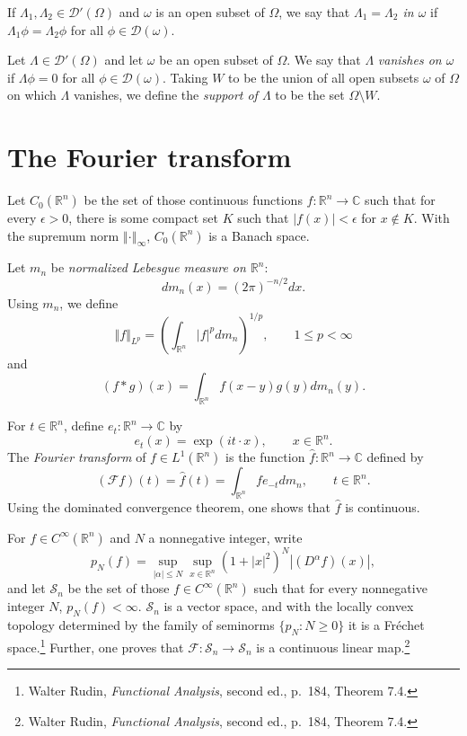 \documentclass{article}
\newcommand{\norm}[1]{\left\Vert #1 \right\Vert}
\theoremstyle{definition}
\begin{document}
If $\Lambda_1,\Lambda_2 \in \mathscr{D}'(\Omega)$ and $\omega$ is an open subset of $\Omega$, we say that
{\em $\Lambda_1 = \Lambda_2$ in $\omega$} if $\Lambda_1 \phi = \Lambda_2 \phi$ for all $\phi \in \mathscr{D}(\omega)$. 

Let $\Lambda \in \mathscr{D}'(\Omega)$ and let  $\omega$ be an open subset of $\Omega$. We say that $\Lambda$
{\em vanishes on $\omega$} if $\Lambda \phi = 0$ for all $\phi \in \mathscr{D}(\omega)$.
Taking $W$ to be the union of all open subsets $\omega$ of $\Omega$ on which $\Lambda$ vanishes, we define the {\em support of $\Lambda$} to be the set 
$\Omega \setminus W$. 




\section{The Fourier transform}
Let $C_0(\mathbb{R}^n)$ be the set of those continuous functions $f:\mathbb{R}^n \to \mathbb{C}$ such that for every $\epsilon>0$, there is some compact
set $K$ such that $|f(x)|<\epsilon$ for $x \not \in K$. With the supremum norm $\norm{\cdot}_\infty$, $C_0(\mathbb{R}^n)$ is a Banach space.

Let $m_n$ be {\em normalized Lebesgue measure on $\mathbb{R}^n$}: 
\[
dm_n(x) = (2\pi)^{-n/2} dx.
\]
Using $m_n$, we define
\[
\norm{f}_{L^p} = \left( \int_{\mathbb{R}^n} |f|^p dm_n\right)^{1/p}, \qquad 1 \leq p < \infty
\]
and 
\[
(f*g)(x) = \int_{\mathbb{R}^n} f(x-y) g(y) dm_n(y).
\]


For $t \in \mathbb{R}^n$, define $e_t:\mathbb{R}^n \to \mathbb{C}$ by
\[
e_t(x) = \exp(it\cdot x), \qquad x \in \mathbb{R}^n.
\]
The {\em Fourier transform} of $f \in L^1(\mathbb{R}^n)$ is the function $\hat{f}:\mathbb{R}^n \to \mathbb{C}$ defined by
\[
(\mathscr{F}f)(t) = \hat{f}(t) = \int_{\mathbb{R}^n} f e_{-t} dm_n, \qquad t \in \mathbb{R}^n.
\]
Using the dominated convergence theorem, one shows that $\hat{f}$ is continuous.






For $f \in C^\infty(\mathbb{R}^n)$ and $N$ a nonnegative integer, write
\[
p_N(f) = \sup_{|\alpha| \leq N} \sup_{x \in \mathbb{R}^n} (1+|x|^2)^N |(D^\alpha f)(x)|,
\]
and let $\mathscr{S}_n$ be the set of those $f \in C^\infty(\mathbb{R}^n)$ such that for every nonnegative integer $N$, $p_N(f)<\infty$.
$\mathscr{S}_n$ is a vector space, and with the locally convex topology determined by the family of seminorms
$\{p_N: N \geq 0\}$ it is a Fr\'echet space.\footnote{Walter Rudin, {\em Functional Analysis}, second ed., p.~184, Theorem 7.4.}
Further, one proves that $\mathscr{F}:\mathscr{S}_n \to \mathscr{S}_n$ is a continuous linear map.\footnote{Walter
Rudin, {\em Functional Analysis}, second ed., p.~184, Theorem 7.4.}
\end{document}
